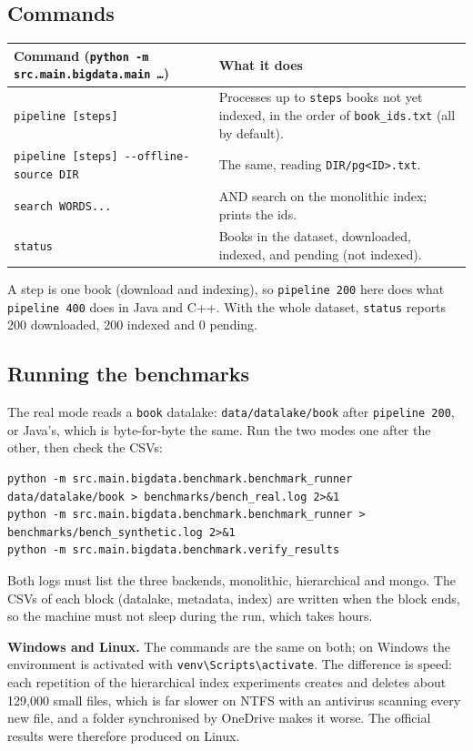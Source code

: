 \documentclass[11pt,a4paper]{article}
\newcommand{\code}[1]{\texttt{#1}}
\begin{document}
\subsection{Commands}
\begin{table}[H]
\centering\small
\begin{tabularx}{\linewidth}{@{}p{5.2cm} Y@{}}
\toprule
Command (\code{python -m src.main.bigdata.main \ldots}) & What it does \\
\midrule
\code{pipeline [steps]} & Processes up to \code{steps} books not yet indexed, in the order of \code{book\_ids.txt} (all by default). \\
\code{pipeline [steps] -{}-offline-source DIR} & The same, reading \code{DIR/pg<ID>.txt}. \\
\code{search WORDS...} & AND search on the monolithic index; prints the ids. \\
\code{status} & Books in the dataset, downloaded, indexed, and pending (not indexed). \\
\bottomrule
\end{tabularx}
\end{table}
A step is one book (download and indexing), so \code{pipeline 200} here does what
\code{pipeline 400} does in Java and C++. With the whole dataset, \code{status} reports 200
downloaded, 200 indexed and 0 pending.

\subsection{Running the benchmarks}
The real mode reads a \code{book} datalake: \code{data/datalake/book} after \code{pipeline 200}, or
Java's, which is byte-for-byte the same. Run the two modes one after the other, then check the CSVs:
\begin{lstlisting}[style=shell]
python -m src.main.bigdata.benchmark.benchmark_runner data/datalake/book > benchmarks/bench_real.log 2>&1
python -m src.main.bigdata.benchmark.benchmark_runner > benchmarks/bench_synthetic.log 2>&1
python -m src.main.bigdata.benchmark.verify_results
\end{lstlisting}
Both logs must list the three backends, monolithic, hierarchical and mongo. The CSVs of each
block (datalake, metadata, index) are written when the block ends, so the machine must not sleep
during the run, which takes hours.

\textbf{Windows and Linux.} The commands are the same on both; on Windows the environment is
activated with \code{venv\textbackslash Scripts\textbackslash activate}. The difference is speed:
each repetition of the hierarchical index
experiments creates and deletes about 129,000 small files, which is far slower on NTFS with an
antivirus scanning every new file, and a folder synchronised by OneDrive makes it worse. The
official results were therefore produced on Linux.
\end{document}
